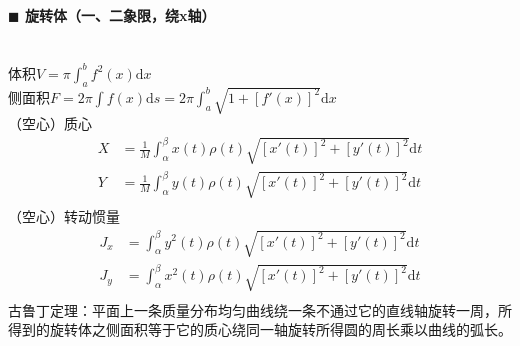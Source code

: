 \paragraph{$\blacksquare$ 旋转体（一、二象限，绕x轴）}
\noindent \\
体积$V=\pi \int_{a}^{b} f^2(x) \mathrm{d} x$\\
侧面积$F=2\pi \int f(x) \mathrm{d} s=2\pi \int_{a}^{b} \sqrt{1+[f'(x)]^2} \mathrm{d} x$\\
（空心）质心
\begin{align*}
	X&=\frac{1}{M} \int_{\alpha}^{\beta} x(t) \rho (t) \sqrt{[x'(t)]^2+[y'(t)]^2} \mathrm{d} t\\
	Y&=\frac{1}{M} \int_{\alpha}^{\beta} y(t) \rho (t) \sqrt{[x'(t)]^2+[y'(t)]^2} \mathrm{d} t\\
\end{align*}
（空心）转动惯量
\begin{align*}
	J_x&=\int_{\alpha}^{\beta} y^2(t) \rho (t) \sqrt{[x'(t)]^2+[y'(t)]^2} \mathrm{d} t\\
	J_y&=\int_{\alpha}^{\beta} x^2(t) \rho (t) \sqrt{[x'(t)]^2+[y'(t)]^2} \mathrm{d} t\\
\end{align*}
古鲁丁定理：平面上一条质量分布均匀曲线绕一条不通过它的直线轴旋转一周，所得到的旋转体之侧面积等于它的质心绕同一轴旋转所得圆的周长乘以曲线的弧长。
